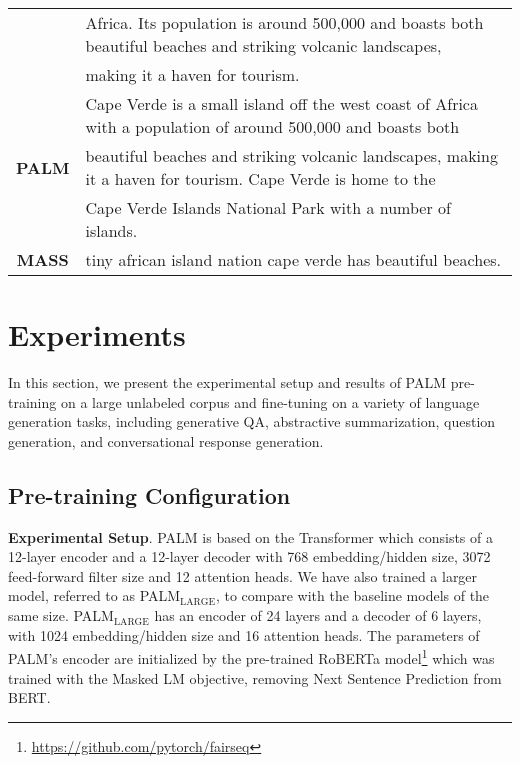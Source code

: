 \documentclass[11pt,a4paper]{article}
\newcommand{\method}{PALM\xspace}
\begin{document}
\begin{table*}[t]
\begin{tabular}{ c | l }
& Africa. Its population is around 500,000 and boasts both beautiful beaches and striking volcanic landscapes,\\
& making it a haven for tourism.\\
\hline
\multirow{3}{*}{\textbf{\method}} & Cape Verde is a small island off the west coast of Africa with a population of around 500,000 and boasts both\\
& beautiful beaches and striking volcanic landscapes, making it a haven for tourism. Cape Verde is home to the\\
& Cape Verde Islands National Park with a number of islands.\\
\hline
\textbf{MASS} & tiny african island nation cape verde has beautiful beaches.\\
\hline\hline
\end{tabular}
\caption{Example generated continuations of the text input to \method and MASS.}
\label{table:pretraining}
\vspace{-10pt}
\end{table*}

\section{Experiments}
In this section, we present the experimental setup and results of \method pre-training on a large unlabeled corpus and fine-tuning on a variety of language generation tasks, including generative QA, abstractive summarization, question generation, and conversational response generation.



\subsection{Pre-training Configuration}
\textbf{Experimental Setup}. \method is based on the Transformer which consists of a 12-layer encoder and a 12-layer decoder with 768 embedding/hidden size, 3072 feed-forward filter size and 12 attention heads. We have also trained a larger model, referred to as \method$_{\text{LARGE}}$, to compare with the baseline models of the same size. \method$_{\text{LARGE}}$ has an encoder of 24 layers and a decoder of 6 layers, with 1024 embedding/hidden size and 16 attention heads. The parameters of PALM's encoder are initialized by the pre-trained RoBERTa model\footnote{\url{https://github.com/pytorch/fairseq}} which was trained with the Masked LM objective, removing Next Sentence Prediction from BERT.
\end{document}
